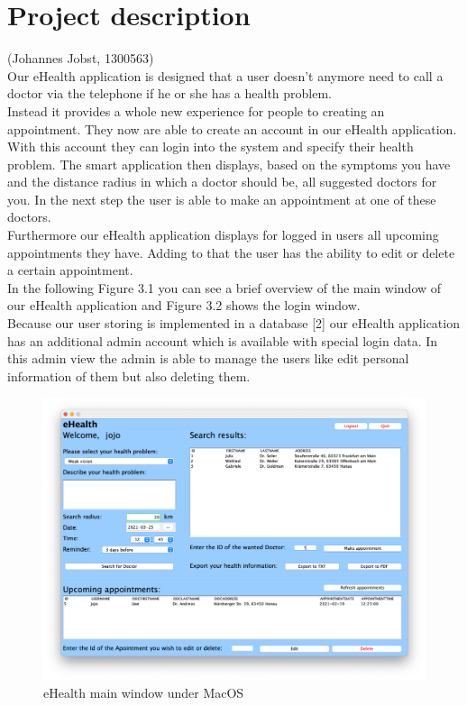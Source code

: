\documentclass[a4paper, 12pt]{report}
\begin{document}
{\let\clearpage\relax \chapter{Project description}}
{\tiny (Johannes Jobst, 1300563)\\}
Our eHealth application is designed that a user doesn't anymore need to call a doctor via the telephone if he or she has a health problem. \\
Instead it provides a whole new experience for people to creating an appointment. They now are able to create an account in our eHealth application. With this account they can login into the system and specify their health problem. The smart application then displays, based on the symptoms you have and the distance radius in which a doctor should be, all suggested doctors for you. In the next step the user is able to make an appointment at one of these doctors. \\
Furthermore our eHealth application displays for logged in users all upcoming appointments they have. Adding to that the user has the ability to edit or delete a certain appointment. \\ In the following Figure 3.1 you can see a brief overview of the main window of our eHealth application and Figure 3.2 shows the login window.
\\
Because our user storing is implemented in a database [2] our eHealth application has an additional admin account which is available with special login data. In this admin view the admin is able to manage the users like edit personal information of them but also deleting them.
\\
\begin{figure}[!h]
\includegraphics[width=\linewidth]{main.png} 
\caption{eHealth main window under MacOS}
\end{figure}
\end{document}
